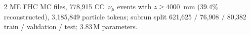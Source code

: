 2 ME FHC MC files, 778{,}915 CC~$\nu_\mu$ events with $z \ge 4000$~mm (39.4\% reconstructed), 3{,}185{,}849 particle tokens; subrun split 621{,}625 / 76{,}908 / 80{,}382 train / validation / test; 3.83\,M parameters.
